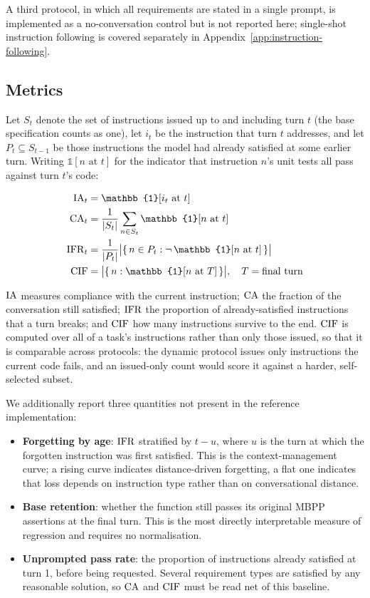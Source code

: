 A third protocol, in which all requirements are stated in a single prompt, is
implemented as a no-conversation control but is not reported here; single-shot
instruction following is covered separately in
Appendix~\ref{app:instruction-following}.

\subsection{Metrics}

Let $S_t$ denote the set of instructions issued up to and including turn $t$
(the base specification counts as one), let $i_t$ be the instruction that turn
$t$ addresses, and let $P_t \subseteq S_{t-1}$ be those instructions the model
had already satisfied at some earlier turn. Writing $\mathbb{1}[n \text{ at } t]$
for the indicator that instruction $n$'s unit tests all pass against turn $t$'s
code:

\begin{align}
  \IA_t  &= \mathbb{1}[i_t \text{ at } t] \\
  \CA_t  &= \frac{1}{|S_t|}\sum_{n \in S_t} \mathbb{1}[n \text{ at } t] \\
  \IFR_t &= \frac{1}{|P_t|}\bigl|\{\, n \in P_t : \neg\,\mathbb{1}[n \text{ at } t] \,\}\bigr| \\
  \CIF   &= \bigl|\{\, n : \mathbb{1}[n \text{ at } T] \,\}\bigr|, \quad T = \text{final turn}
\end{align}

$\mathrm{IA}$ measures compliance with the current instruction; $\mathrm{CA}$ the fraction of
the conversation still satisfied; $\mathrm{IFR}$ the proportion of already-satisfied
instructions that a turn breaks; and $\mathrm{CIF}$ how many instructions survive to the
end. $\mathrm{CIF}$ is computed over all of a task's instructions rather than only those
issued, so that it is comparable across protocols: the dynamic protocol issues
only instructions the current code fails, and an issued-only count would score
it against a harder, self-selected subset.

We additionally report three quantities not present in the reference
implementation:

\begin{itemize}
  \item \textbf{Forgetting by age}: $\mathrm{IFR}$ stratified by $t - u$, where $u$ is
    the turn at which the forgotten instruction was first satisfied. This is the
    context-management curve; a rising curve indicates distance-driven
    forgetting, a flat one indicates that loss depends on instruction type
    rather than on conversational distance.
  \item \textbf{Base retention}: whether the function still passes its original
    MBPP assertions at the final turn. This is the most directly interpretable
    measure of regression and requires no normalisation.
  \item \textbf{Unprompted pass rate}: the proportion of instructions already
    satisfied at turn 1, before being requested. Several requirement types are
    satisfied by any reasonable solution, so $\mathrm{CA}$ and $\mathrm{CIF}$ must be read net
    of this baseline.
\end{itemize}

